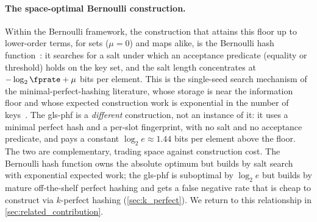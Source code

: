 \documentclass[ ../main.tex]{subfiles}
\begin{document}
\paragraph{The space-optimal Bernoulli construction.}
Within the Bernoulli framework, the construction that attains this floor up to lower-order terms, for sets ($\mu = 0$) and maps alike, is the Bernoulli hash function~\cite{shs}: it searches for a salt under which an acceptance predicate (equality or threshold) holds on the key set, and the salt length concentrates at $-\log_2 \fprate + \mu$ bits per element. This is the single-seed search mechanism of the minimal-perfect-hashing literature, whose storage is near the information floor and whose expected construction work is exponential in the number of keys~\cite{lehmann2025seeds}. The \gls{gls-phf} is a \emph{different} construction, not an instance of it: it uses a minimal perfect hash and a per-slot fingerprint, with no salt and no acceptance predicate, and pays a constant $\log_2 e \approx 1.44$ bits per element above the floor. The two are complementary, trading space against construction cost. The Bernoulli hash function owns the absolute optimum but builds by salt search with exponential expected work; the \gls{gls-phf} is suboptimal by $\log_2 e$ but builds by mature off-the-shelf perfect hashing and gets a false negative rate that is cheap to construct via $k$-perfect hashing (\cref{sec:k_perfect}). We return to this relationship in \cref{sec:related_contribution}.
\end{document}
